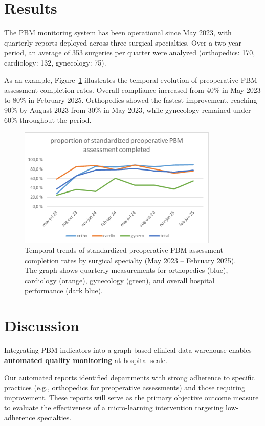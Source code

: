 \documentclass{IOS-Book-Article}
\begin{document}
\section{Results}

The PBM monitoring system has been operational since May 2023, with quarterly 
reports deployed across three surgical specialties. Over a two-year period, an 
average of 353 surgeries per quarter were analyzed (orthopedics: 170, 
cardiology: 132, gynecology: 75).

As an example, Figure~\ref{fig:pbm_trends} illustrates the temporal evolution of preoperative 
PBM assessment completion rates. Overall compliance increased from 40\% in May 
2023 to 80\% in February 2025. Orthopedics showed the fastest improvement, 
reaching 90\% by August 2023 from 30\% in May 2023, while gynecology remained under
60\% throughout the period.

\begin{figure}[h!]
\centering
\includegraphics[width=0.85\textwidth]{figure.png}
\caption{Temporal trends of standardized preoperative PBM assessment completion rates by surgical specialty (May 2023 -- February 2025). The graph shows quarterly measurements for orthopedics (blue), cardiology (orange), gynecology (green), and overall hospital performance (dark blue).}
\label{fig:pbm_trends}
\end{figure}

\section{Discussion}

Integrating PBM indicators into a graph-based clinical data warehouse enables
 \textbf{automated quality monitoring} at hospital scale.

Our automated reports identified departments with strong adherence to specific practices 
(e.g., orthopedics for preoperative assessments) and those requiring improvement. 
These reports will serve as the primary objective outcome measure to evaluate the 
effectiveness of a micro-learning intervention targeting low-adherence specialties.
\end{document}
